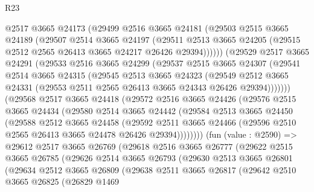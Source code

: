 \begin{lexlean}{R23}
\begin{coremodule}
          @2517
          @3665
          @24173
          (@29499
            @2516
            @3665
            @24181
            (@29503
              @2515
              @3665
              @24189
              (@29507
                @2514
                @3665
                @24197
                (@29511
                  @2513
                  @3665
                  @24205
                  (@29515 @2512 @2565 @26413 @3665 @24217 @26426 @29394))))))
        (@29529
          @2517
          @3665
          @24291
          (@29533
            @2516
            @3665
            @24299
            (@29537
              @2515
              @3665
              @24307
              (@29541
                @2514
                @3665
                @24315
                (@29545
                  @2513
                  @3665
                  @24323
                  (@29549
                    @2512
                    @3665
                    @24331
                    (@29553 @2511 @2565 @26413 @3665 @24343 @26426 @29394)))))))
        (@29568
          @2517
          @3665
          @24418
          (@29572
            @2516
            @3665
            @24426
            (@29576
              @2515
              @3665
              @24434
              (@29580
                @2514
                @3665
                @24442
                (@29584
                  @2513
                  @3665
                  @24450
                  (@29588
                    @2512
                    @3665
                    @24458
                    (@29592
                      @2511
                      @3665
                      @24466
                      (@29596 @2510 @2565 @26413 @3665 @24478 @26426 @29394))))))))
        (fun (value : @2590) =>
        @29612
          @2517
          @3665
          @26769
          (@29618
            @2516
            @3665
            @26777
            (@29622
              @2515
              @3665
              @26785
              (@29626
                @2514
                @3665
                @26793
                (@29630
                  @2513
                  @3665
                  @26801
                  (@29634
                    @2512
                    @3665
                    @26809
                    (@29638
                      @2511
                      @3665
                      @26817
                      (@29642
                        @2510
                        @3665
                        @26825
                        (@26829
                          @1469

\end{coremodule}
\end{lexlean}
